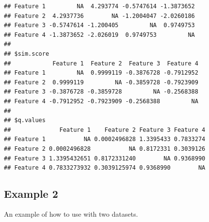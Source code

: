 \documentclass{article}\usepackage[]{graphicx}\usepackage[usenames,dvipsnames]{color}
\newenvironment{knitrout}{}{} %
\begin{document}
\begin{knitrout}
\begin{kframe}
\begin{verbatim}
## Feature 1         NA  4.293774 -0.5747614 -1.3873652
## Feature 2  4.2937736        NA -1.2004047 -2.0260186
## Feature 3 -0.5747614 -1.200405         NA  0.9749753
## Feature 4 -1.3873652 -2.026019  0.9749753         NA
## 
## $sim.score
##            Feature 1  Feature 2  Feature 3  Feature 4
## Feature 1         NA  0.9999119 -0.3876728 -0.7912952
## Feature 2  0.9999119         NA -0.3859728 -0.7923909
## Feature 3 -0.3876728 -0.3859728         NA -0.2568388
## Feature 4 -0.7912952 -0.7923909 -0.2568388         NA
## 
## $q.values
##              Feature 1    Feature 2 Feature 3 Feature 4
## Feature 1           NA 0.0002496828 1.3395433 0.7833274
## Feature 2 0.0002496828           NA 0.8172331 0.3039126
## Feature 3 1.3395432651 0.8172331240        NA 0.9368990
## Feature 4 0.7833273932 0.3039125974 0.9368990        NA
\end{verbatim}
\end{kframe}
\end{knitrout}

\subsection{Example 2}

An example of how to use  with two datasets.
\end{document}

